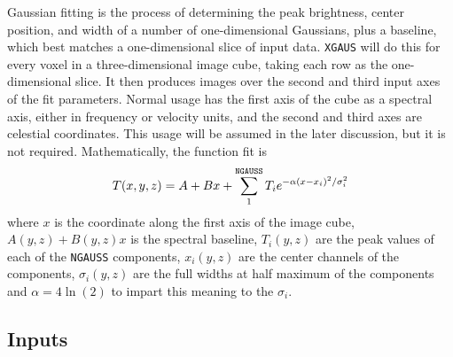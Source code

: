 \documentclass[twoside]{article}
\begin{document}
Gaussian fitting is the process of determining the peak brightness,
center position, and width of a number of one-dimensional Gaussians,
plus a baseline, which best matches a one-dimensional slice of input
data.  {\tt XGAUS} will do this for every voxel in a three-dimensional
image cube, taking each row as the one-dimensional slice.  It then
produces images over the second and third input axes of the fit
parameters.  Normal usage has the first axis of the cube as a spectral
axis, either in frequency or velocity units, and the second and third
axes are celestial coordinates.  This usage will be assumed in the
later discussion, but it is not required.  Mathematically, the function
fit is
\begin{equation}
  T(x,y,z) = A + Bx + \sum_1^{\tt NGAUSS} T_i e^{-\alpha (x - x_i)^2 /
     \sigma_i^2}
\end{equation}
where $x$ is the coordinate along the first axis of the image cube,
$A(y,z) + B(y,z)x$ is the spectral baseline, $T_i(y,z)$ are the peak
values of each of the {\tt NGAUSS} components, $x_i(y,z)$ are the
center channels of the components, $\sigma_i(y,z)$  are the full
widths at half maximum of the components and $\alpha = 4 \ln(2)$ to
impart this meaning to the $\sigma_i$.

\subsection{Inputs}
\end{document}
